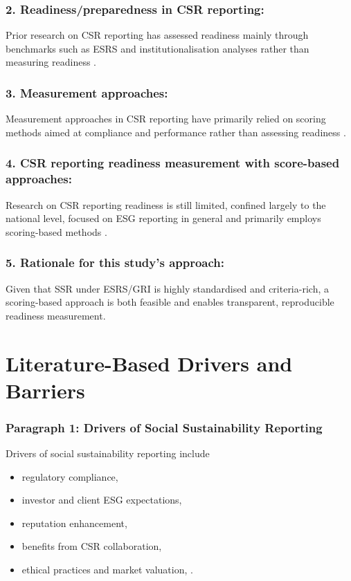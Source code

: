 \subsubsection{2. Readiness/preparedness in CSR reporting:}
Prior research on CSR reporting has assessed readiness mainly through benchmarks 
such as ESRS and institutionalisation analyses rather than measuring readiness 
\parencite{Filho2025,Shabana2017}. 

\subsubsection{3. Measurement approaches:}
Measurement approaches in CSR reporting have primarily relied on scoring methods
aimed at compliance and performance rather than assessing readiness
\parencite{Tobias2022,Papoutsi2020,Gai2023,Nicolo2025}.

\subsubsection{4. CSR reporting readiness measurement with score-based approaches:}
Research on CSR reporting readiness is still limited, confined largely to the national level,
focused on ESG reporting in general  
and primarily employs scoring-based methods
\parencite{Nguyen2024,Montero2025}.

\subsubsection{5. Rationale for this study's approach:}
Given that SSR under ESRS/GRI is highly standardised and criteria-rich, 
a scoring-based approach is both feasible and enables transparent, reproducible readiness measurement.

\section{Literature-Based Drivers and Barriers}

\subsubsection{Paragraph 1: Drivers of Social Sustainability Reporting}
Drivers of social sustainability reporting include 
\begin{itemize}
    \item regulatory compliance, \parencite{Reitmaier2024,Bochkay2025}
    \item investor and client ESG expectations, \parencite{Bonnefon2025,Dai2021}
    \item reputation enhancement, \parencite{Reitmaier2024}
    \item benefits from CSR collaboration, \parencite{Dai2021}
    \item ethical practices and market valuation, \parencite{Chouaibi2021}.
\end{itemize}

